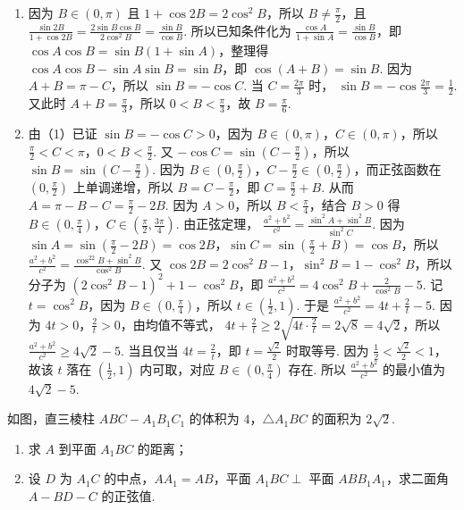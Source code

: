 \begin{solution}
\begin{enumerate}
\item 因为 \(B\in(0,\pi)\) 且 \(1+\cos 2B=2\cos^2B\)，所以 \(B\ne \frac{\pi}{2}\)，且
\(\frac{\sin 2B}{1+\cos 2B}=\frac{2\sin B\cos B}{2\cos^2B}=\frac{\sin B}{\cos B}\).
所以已知条件化为
\(\frac{\cos A}{1+\sin A}=\frac{\sin B}{\cos B}\)，即
\(\cos A\cos B=\sin B(1+\sin A)\)，整理得
\(\cos A\cos B-\sin A\sin B=\sin B\)，即
\(\cos(A+B)=\sin B\).
因为 \(A+B=\pi-C\)，所以
\(\sin B=-\cos C\).
当 \(C=\frac{2\pi}{3}\) 时，
\(\sin B=-\cos\frac{2\pi}{3}=\frac12\).
又此时 \(A+B=\frac{\pi}{3}\)，所以 \(0<B<\frac{\pi}{3}\)，故
\(B=\frac{\pi}{6}\).
\item 由（1）已证 \(\sin B=-\cos C>0\)，因为 \(B\in(0,\pi)\)，\(C\in(0,\pi)\)，所以
\(\frac{\pi}{2}<C<\pi\)，\(0<B<\frac{\pi}{2}\).
又 \(-\cos C=\sin\left(C-\frac{\pi}{2}\right)\)，所以
\(\sin B=\sin\left(C-\frac{\pi}{2}\right)\).
因为 \(B\in\left(0,\frac{\pi}{2}\right)\)，\(C-\frac{\pi}{2}\in\left(0,\frac{\pi}{2}\right)\)，而正弦函数在 \(\left(0,\frac{\pi}{2}\right)\) 上单调递增，所以
\(B=C-\frac{\pi}{2}\)，即
\(C=\frac{\pi}{2}+B\).
从而 \(A=\pi-B-C=\frac{\pi}{2}-2B\).
因为 \(A>0\)，所以 \(B<\frac{\pi}{4}\)，结合 \(B>0\) 得
\(B\in\left(0,\frac{\pi}{4}\right)\)，\(C\in\left(\frac{\pi}{2},\frac{3\pi}{4}\right)\).
由正弦定理，
\(\frac{a^2+b^2}{c^2}=\frac{\sin^2A+\sin^2B}{\sin^2C}\).
因为 \(\sin A=\sin\left(\frac{\pi}{2}-2B\right)=\cos 2B\)，\(\sin C=\sin\left(\frac{\pi}{2}+B\right)=\cos B\)，所以
\(\frac{a^2+b^2}{c^2}=\frac{\cos^22B+\sin^2B}{\cos^2B}\).
又 \(\cos 2B=2\cos^2B-1\)，\(\sin^2B=1-\cos^2B\)，所以分子为 \(\left(2\cos^2B-1\right)^2+1-\cos^2B\)，即
\(\frac{a^2+b^2}{c^2}=4\cos^2B+\frac{2}{\cos^2B}-5\).
记 \(t=\cos^2B\)，因为 \(B\in\left(0,\frac{\pi}{4}\right)\)，所以 \(t\in\left(\frac12,1\right)\).
于是 \(\frac{a^2+b^2}{c^2}=4t+\frac{2}{t}-5\).
因为 \(4t>0\)，\(\frac{2}{t}>0\)，由均值不等式，
\(4t+\frac{2}{t}\ge 2\sqrt{4t\cdot \frac{2}{t}}=2\sqrt8=4\sqrt2\)，所以
\(\frac{a^2+b^2}{c^2}\ge 4\sqrt2-5\).
当且仅当 \(4t=\frac{2}{t}\)，即 \(t=\frac{\sqrt2}{2}\) 时取等号.
因为 \(\frac12<\frac{\sqrt2}{2}<1\)，故该 \(t\) 落在 \(\left(\frac12,1\right)\) 内可取，对应 \(B\in\left(0,\frac{\pi}{4}\right)\) 存在.
所以 \(\frac{a^2+b^2}{c^2}\) 的最小值为 \(4\sqrt2-5\).
\end{enumerate}
\end{solution}

\begin{problem}
如图，直三棱柱 \(ABC-A_1B_1C_1\) 的体积为 \(4\)，\(\triangle A_1BC\) 的面积为 \(2\sqrt2\).

\begin{enumerate}
\item 求 \(A\) 到平面 \(A_1BC\) 的距离；

\item 设 \(D\) 为 \(A_1C\) 的中点，\(AA_1=AB\)，平面 \(A_1BC\perp\) 平面 \(ABB_1A_1\)，求二面角 \(A-BD-C\) 的正弦值.
\end{enumerate}

\end{problem}

